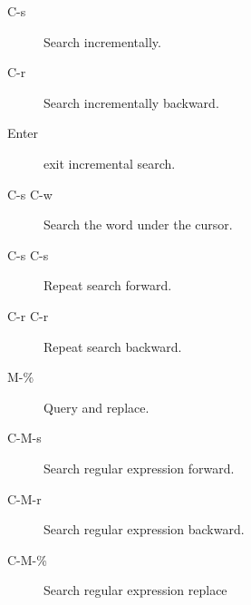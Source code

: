 \begin{description}
\item[C-s] Search incrementally.
\item[C-r] Search incrementally backward.
\item[Enter] exit incremental search.
\item[C-s C-w] Search the word under the cursor.
\item[C-s C-s] Repeat search forward.
\item[C-r C-r] Repeat search backward.
\item[M-\%] Query and replace.
\item[C-M-s] Search regular expression forward.
\item[C-M-r] Search regular expression backward.
\item[C-M-\%] Search regular expression replace
\end{description}


